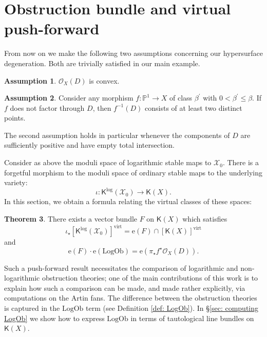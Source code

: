 \documentclass[11pt]{amsart}
\theoremstyle{definition}
\theoremstyle{definition}
\newtheorem{theorem}{Theorem}[section]
\newtheorem{assumption}[theorem]{Assumption}
\newcommand{\op}[1]{\operatorname{#1}}
\newcommand{\e}{\mathrm{e}}
\newcommand{\PP}{\mathbb{P}}
\newcommand{\OO}{\mathcal{O}}
\newcommand{\virt}{\op{virt}}
\newcommand{\LogOb}{\mathrm{LogOb}}
\newcommand{\Xcal}{\mathcal{X}}
\newcommand{\Kup}{\mathsf{K}}
\begin{document}
\section{Obstruction bundle and virtual push-forward} \label{section computing virtual class}
\noindent From now on we make the following two assumptions concerning our hypersurface degeneration. Both are trivially satisfied in our main example.
\begin{assumption}\label{assumption: convexity of D} $\OO_X(D)$ is convex.\end{assumption}
\begin{assumption} \label{assumption factoring through the divisor}\label{assumption factoring through D} Consider any morphism $f \colon \PP^1 \to X$ of class $\beta^\prime$ with $0 < \beta^\prime \leq \beta$. If $f$ does not factor through $D$, then $f^{-1}(D)$ consists of at least two distinct points.\end{assumption}
\noindent The second assumption holds in particular whenever the components of $D$ are sufficiently positive and have empty total intersection.

Consider as above the moduli space of logarithmic stable maps to $\Xcal_0$. There is a forgetful morphism to the moduli space of ordinary stable maps to the underlying variety:
\begin{equation*} \iota \colon \Kup^{\log}(\Xcal_0) \to \Kup(X).\end{equation*}
In this section, we obtain a formula relating the virtual classes of these spaces:
\begin{theorem} \label{thm: virtual pushforward} There exists a vector bundle $F$ on $\Kup(X)$ which satisfies
\begin{equation}\label{eqn: virtual pushforward} \iota_\star [\Kup^{\log}(\Xcal_0)]^{\virt} = \e(F) \cap [\Kup(X)]^{\virt} \end{equation}
and
\begin{equation*} \e(F) \cdot \e(\LogOb) = \e(\pi_\star f^\star \OO_X(D)).\end{equation*}\end{theorem}
\noindent Such a push-forward result necessitates the comparison of logarithmic and non-logarithmic obstruction theories; one of the main contributions of this work is to explain how such a comparison can be made, and made rather explicitly, via computations on the Artin fans. The difference between the obstruction theories is captured in the $\LogOb$ term (see Definition \ref{def: LogOb}). In \S \ref{sec: computing LogOb} we show how to express $\LogOb$ in terms of tautological line bundles on $\Kup(X)$.
\end{document}
